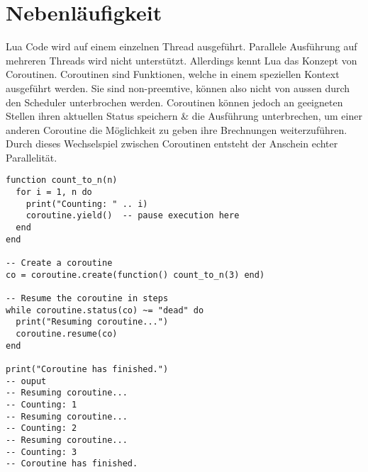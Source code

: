\documentclass[11pt,a4paper]{article}
\begin{document}
\section*{Nebenläufigkeit}

Lua Code wird auf einem einzelnen Thread ausgeführt. Parallele Ausführung auf mehreren Threads wird nicht unterstützt. Allerdings kennt Lua das Konzept von Coroutinen. Coroutinen sind Funktionen, welche in einem speziellen Kontext ausgeführt werden. Sie sind non-preemtive, können also nicht von aussen durch den Scheduler unterbrochen werden. Coroutinen können jedoch an geeigneten Stellen ihren aktuellen Status speichern \& die Ausführung unterbrechen, um einer anderen Coroutine die Möglichkeit zu geben ihre Brechnungen weiterzuführen. Durch dieses Wechselspiel zwischen Coroutinen entsteht der Anschein echter Parallelität.

\begin{lstlisting}
function count_to_n(n)
  for i = 1, n do
    print("Counting: " .. i)
    coroutine.yield()  -- pause execution here
  end
end

-- Create a coroutine
co = coroutine.create(function() count_to_n(3) end)

-- Resume the coroutine in steps
while coroutine.status(co) ~= "dead" do
  print("Resuming coroutine...")
  coroutine.resume(co)
end

print("Coroutine has finished.")
-- ouput
-- Resuming coroutine...
-- Counting: 1
-- Resuming coroutine...
-- Counting: 2
-- Resuming coroutine...
-- Counting: 3
-- Coroutine has finished.
\end{lstlisting}
\end{document}
